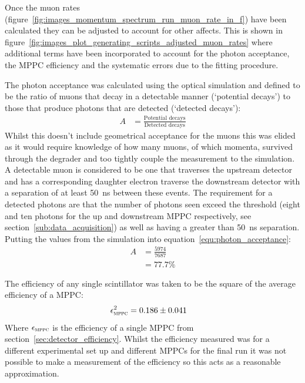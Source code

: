 
\clearpage
Once the muon rates (figure~\ref{fig:images_momentum_spectrum_run_muon_rate_in_f}) have been calculated they can be adjusted to account for other affects. This is shown in figure~\ref{fig:images_plot_generating_scripts_adjusted_muon_rates} where additional terms have been incorporated to account for the photon acceptance, the MPPC efficiency and the systematic errors due to the fitting procedure. 

The photon acceptance was calculated using the optical simulation and defined to be the ratio of muons that decay in a detectable manner (`potential decays') to those that produce photons that are detected (`detected decays'):
\begin{align}
  A &= \frac{\text{Potential decays}}{\text{Detected decays}} \label{equ:photon_acceptance}
\end{align}
Whilst this doesn't include geometrical acceptance for the muons this was elided as it would require knowledge of how many muons, of which momenta, survived through the degrader and too tightly couple the measurement to the simulation. A detectable muon is considered to be one that traverses the upstream detector and has a corresponding daughter electron traverse the downstream detector with a separation of at least 50~ns between these events. The requirement for a detected photons are that the number of photons seen exceed the threshold (eight and ten photons for the up and downstream MPPC respectively, see section~\ref{sub:data_acquisition}) as well as having a greater than 50~ns separation. Putting the values from the simulation into equation~\eqref{equ:photon_acceptance}:
\begin{align}
  A &= \frac{5974}{7687} \\
    &= 77.7\%
\end{align}

The efficiency of any single scintillator was taken to be the square of the average efficiency of a MPPC:
\begin{align}
  \epsilon_{\textsc{mppc}}^2 &= 0.186 \pm 0.041 
\end{align}
Where \(\epsilon_{\textsc{mppc}}\) is the efficiency of a single MPPC from section~\ref{sec:detector_efficiency}. Whilst the efficiency measured was for a different experimental set up and different MPPCs for the final run it was not possible to make a measurement of the efficiency so this acts as a reasonable approximation.

